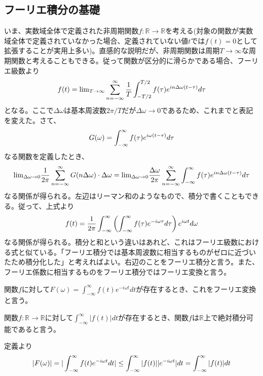 \documentclass[dvipdfmx, 9pt, a4paper]{jsarticle}
\begin{document}
\subsection{フーリエ積分の基礎}
いま、実数域全体で定義された非周期関数$f:\mathbb{R} \to \mathbb{R}$を考える(対象の関数が実数域全体で定義されていなかった場合、定義されていない値$t$では$f(t)=0$として拡張することが実用上多い)。直感的な説明だが、非周期関数は周期$T \to \infty$な周期関数と考えることもできる。従って関数が区分的に滑らかである場合、フーリエ級数より
\begin{equation}
f(t)={\rm lim}_{T\to \infty}\sum_{n=-\infty}^\infty \frac{1}{T}\int_{-T/2}^{T/2}f(\tau)e^{in\Delta \omega (t-\tau)}d\tau
\end{equation}
となる。ここで$\Delta \omega$は基本周波数$2\pi/T$だが$\Delta \omega \to 0$であるため、これまでと表記を変えた。さて、
\begin{equation}
G(\omega)=\int_{-\infty}^\infty f(\tau)e^{i\omega(t-\tau)}d\tau \notag
\end{equation}
なる関数を定義したとき、
\begin{equation}
{\rm lim}_{\Delta \omega \to 0}\frac{1}{2\pi}\sum_{n=-\infty}^\infty G(n\Delta \omega)\cdot \Delta \omega={\rm lim}_{\Delta \omega \to 0} \frac{\Delta \omega}{2\pi}\sum_{n=-\infty}^\infty\int_{-\infty}^\infty f(\tau)e^{in\Delta \omega(t-\tau)}d\tau \notag
\end{equation}
なる関係が得られる。左辺はリーマン和のようなもので、積分で書くこともできる。従って、上式より
\begin{equation}
f(t)=\frac{1}{2\pi}\int_{-\infty}^{\infty}\left( \int_{-\infty}^\infty f(\tau)e^{-i\omega \tau}d\tau \right)e^{i\omega t}d\omega \notag
\end{equation}
なる関係が得られる。積分と和という違いはあれど、これはフーリエ級数における式と似ている。「フーリエ積分では基本周波数に相当するものがゼロに近づいたため積分化した」と考えればよい。右辺のことをフーリエ積分と言う。また、フーリエ係数に相当するものをフーリエ積分ではフーリエ変換と言う。
\begin{tcolorbox}[title=フーリエ変換]
関数$f$に対して$F(\omega)=\int_{-\infty}^\infty f(t)e^{-i\omega t}dt$が存在するとき、これをフーリエ変換と言う。
\end{tcolorbox}
\begin{tcolorbox}[title=絶対積分可能]
関数$f:\mathbb{R} \to \mathbb{R}$に対して$\int_{-\infty}^{\infty}|f(t)|dt$が存在するとき、関数$f$は$\mathbb{R}$上で絶対積分可能であると言う。
\end{tcolorbox}
定義より
\begin{equation}
|F(\omega)|=|\int_{-\infty}^\infty f(t)e^{-i\omega t}dt| \leq \int_{-\infty}^\infty |f(t)||e^{-i\omega t}|dt=\int_{-\infty}^\infty |f(t)|dt \notag
\end{equation}
\end{document}
